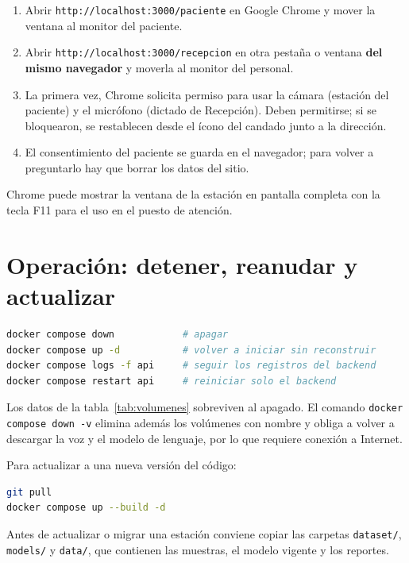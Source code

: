 \begin{enumerate}
  \item Abrir \texttt{http://localhost:3000/paciente} en Google Chrome y mover la ventana al monitor del paciente.
  \item Abrir \texttt{http://localhost:3000/recepcion} en otra pestaña o ventana \textbf{del mismo navegador} y moverla al monitor del personal.
  \item La primera vez, Chrome solicita permiso para usar la cámara (estación del paciente) y el micrófono (dictado de Recepción). Deben permitirse; si se bloquearon, se restablecen desde el ícono del candado junto a la dirección.
  \item El consentimiento del paciente se guarda en el navegador; para volver a preguntarlo hay que borrar los datos del sitio.
\end{enumerate}

Chrome puede mostrar la ventana de la estación en pantalla completa con la tecla F11 para el uso en el puesto de atención.

\section{Operación: detener, reanudar y actualizar}

\begin{lstlisting}[numbers=none, language=bash]
docker compose down            # apagar
docker compose up -d           # volver a iniciar sin reconstruir
docker compose logs -f api     # seguir los registros del backend
docker compose restart api     # reiniciar solo el backend
\end{lstlisting}

Los datos de la tabla~\ref{tab:volumenes} sobreviven al apagado. El comando \texttt{docker compose down -v} elimina además los volúmenes con nombre y obliga a volver a descargar la voz y el modelo de lenguaje, por lo que requiere conexión a Internet.

Para actualizar a una nueva versión del código:

\begin{lstlisting}[numbers=none, language=bash]
git pull
docker compose up --build -d
\end{lstlisting}

Antes de actualizar o migrar una estación conviene copiar las carpetas \texttt{dataset/}, \texttt{models/} y \texttt{data/}, que contienen las muestras, el modelo vigente y los reportes.

